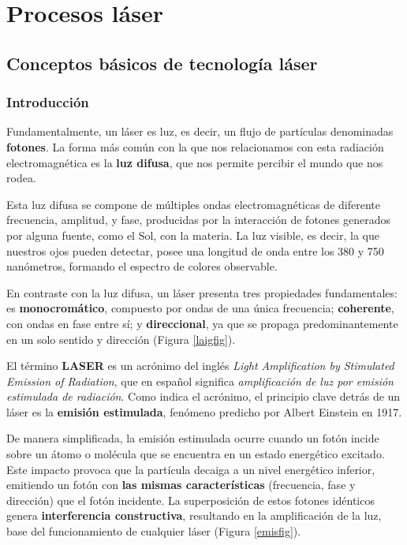 \chapter{Procesos láser}

\section{Conceptos básicos de tecnología láser}

\subsection{Introducción}

Fundamentalmente, un láser es luz, es decir, un flujo de partículas denominadas \textbf{fotones}. La forma más común con la que nos relacionamos con esta radiación electromagnética es la \textbf{luz difusa}, que nos permite percibir el mundo que nos rodea.

Esta luz difusa se compone de múltiples ondas electromagnéticas de diferente frecuencia, amplitud, y fase, producidas por la interacción de fotones generados por alguna fuente, como el Sol, con la materia. La luz visible, es decir, la que nuestros ojos pueden detectar, posee una longitud de onda entre los 380 y 750 nanómetros, formando el espectro de colores observable.

En contraste con la luz difusa, un láser presenta tres propiedades fundamentales: es \textbf{monocromático}, compuesto por ondas de una única frecuencia; \textbf{coherente}, con ondas en fase entre sí; y \textbf{direccional}, ya que se propaga predominantemente en un solo sentido y dirección (Figura \ref{laigfig}). 

El término \textbf{LASER} es un acrónimo del inglés \textit{Light Amplification by Stimulated Emission of Radiation}, que en español significa \textit{amplificación de luz por emisión estimulada de radiación}. Como indica el acrónimo, el principio clave detrás de un láser es la \textbf{emisión estimulada}, fenómeno predicho por Albert Einstein en 1917.

De manera simplificada, la emisión estimulada ocurre cuando un fotón incide sobre un átomo o molécula que se encuentra en un estado energético excitado. Este impacto provoca que la partícula decaiga a un nivel energético inferior, emitiendo un fotón con \textbf{las mismas características} (frecuencia, fase y dirección) que el fotón incidente. La superposición de estos fotones idénticos genera \textbf{interferencia constructiva}, resultando en la amplificación de la luz, base del funcionamiento de cualquier láser (Figura \ref{emisfig}).

